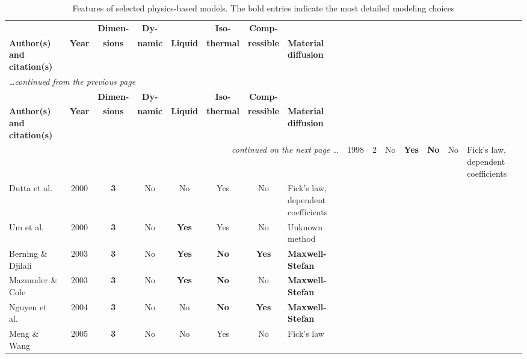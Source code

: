 \begin{landscape}
  \begin{longtable}{lccccccl}
    \caption[Features of selected physics-based fuel cell models]{Features of selected physics-based  models.  The bold entries indicate the most detailed modeling choices}%
    \label{tab:PhysicsBasedModels} \\
    \toprule
       &  & \textbf{Dimen-} & \textbf{Dy-} &  & \textbf{Iso-} & \textbf{Comp-} & \vspace{-2ex}\\
       \textbf{Author(s) and citation(s)} & \textbf{Year} & \textbf{sions} & \textbf{namic} & \textbf{Liquid} & \textbf{thermal} & \textbf{ressible} & \textbf{Material diffusion} \\
    \midrule
    \endfirsthead
      \multicolumn{8}{l}{\ldots \textit{continued from the previous page}} \\
       &  & \textbf{Dimen-} & \textbf{Dy-} &  & \textbf{Iso-} & \textbf{Comp-} & \vspace{-2ex}\\
       \textbf{Author(s) and citation(s)} & \textbf{Year} & \textbf{sions} & \textbf{namic} & \textbf{Liquid} & \textbf{thermal} & \textbf{ressible} & \textbf{Material diffusion} \\
    \midrule
    \endhead
    \midrule
    \multicolumn{8}{r}{\textit{continued on the next page \ldots}}
    \endfoot
    \bottomrule
    \endlastfoot
    Gurau et al.~\cite{Gurau1998} & 1998 & 2 & No & \textbf{Yes} & \textbf{No} & No & Fick's law, dependent coefficients \\
    Dutta et al.~\cite{Dutta2000} & 2000 & \textbf{3} & No & No & Yes & No & Fick's law, dependent coefficients \\
    Um et al.~\cite{Um2000, Um2004} & 2000 & \textbf{3} & No & \textbf{Yes} & Yes & No & Unknown method \\
    Berning \& Djilali~\cite{Berning2003} & 2003 & \textbf{3} & No & \textbf{Yes} & \textbf{No} & \textbf{Yes} & \textbf{Maxwell-Stefan} \\
    Mazumder \& Cole~\cite{Mazumder2003a, Mazumder2003b} & 2003 & \textbf{3} & No & \textbf{Yes} & \textbf{No} & No & \textbf{Maxwell-Stefan} \\
    Nguyen et al.~\cite{Nguyen2004} & 2004 & \textbf{3} & No & No & \textbf{No} & \textbf{Yes} & \textbf{Maxwell-Stefan} \\
    Meng \& Wang~\cite{Meng2005} & 2005 & \textbf{3} & No & No & Yes & No & Fick's law \\

\end{longtable}
\end{landscape}
